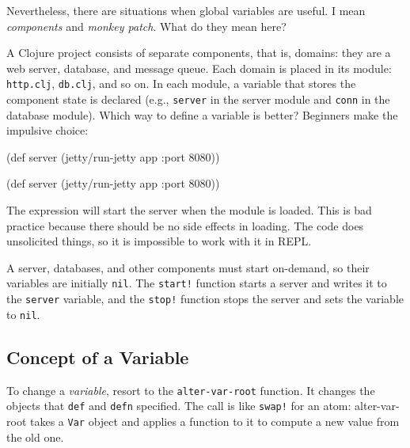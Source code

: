 
Nevertheless, there are situations when global variables are useful.
I mean \emph{components} and \emph{monkey patch}. What do they mean here?

A Clojure project consists of separate components, that is, domains: they are a web server, database, and message queue.
Each domain is placed in its module: \verb|http.clj|, \verb|db.clj|, and so on. In each module, a variable that stores the component state is declared (e.g., \verb|server| in the server module and \verb|conn| in the database module).
Which way to define a variable is better?
Beginners make the impulsive choice:

\ifx\DEVICETYPE\MOBILE

\begin{clojure}
(def server
  (jetty/run-jetty app {:port 8080}))
\end{clojure}

\else

\begin{clojure}
(def server (jetty/run-jetty app {:port 8080}))
\end{clojure}

\fi

The expression will start the server when the module is loaded. This is bad practice because there should be no side effects in loading.
The code does unsolicited things, so it is impossible to work with it in REPL.

A server, databases, and other components must start on-demand, so their variables are initially \verb|nil|.
The \verb|start!| function starts a server and writes it to the \verb|server| variable, and the \verb|stop!| function stops the server and sets the variable to \verb|nil|.

\subsection{Concept of a Variable}


\label{var-section}

To change a \emph{variable}, resort to the \verb|alter-var-root| function.
It changes the objects that \verb|def| and \verb|defn| specified.
The call is like \verb|swap!| for an atom: alter-var-root takes a \verb|Var| object and applies a function to it to compute a new value from the old one.


